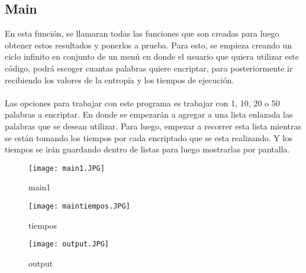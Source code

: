 \documentclass{article}
\begin{document}
\subsection{Main}
En esta función, se llamaran todas las funciones que son creadas para luego obtener estos resultados y ponerlos a prueba. Para esto, se empieza creando un ciclo infinito en conjunto de un menú en donde el usuario que quiera utilizar este código, podrá escoger cuantas palabras quiere encriptar, para posteriormente ir recibiendo los valores de la entropía y los tiempos de ejecución.
\\\\
Las opciones para trabajar con este programa es trabajar con 1, 10, 20 o 50 palabras a encriptar. En donde se empezarán a agregar a una lista enlazada las palabras que se desean utilizar. Para luego, empezar a recorrer esta lista mientras se están tomando los tiempos por cada encriptado que se esta realizando. Y los tiempos se irán guardando dentro de listas para luego mostrarlas por pantalla.
\begin{figure}[h]
    \centering
    \texttt{[image: main1.JPG]}
    \caption{main1}
    \label{fig:my_label}
\end{figure}

\begin{figure}[h]
    \centering
    \texttt{[image: maintiempos.JPG]}
    \caption{tiempos}
    \label{fig:my_label}
\end{figure}

\begin{figure}[h]
    \centering
    \texttt{[image: output.JPG]}
    \caption{output}
    \label{fig:my_label}
\end{figure}
\newpage
\end{document}
